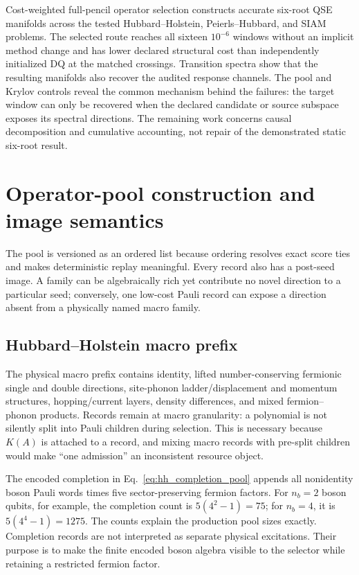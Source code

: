 \documentclass[
  reprint,
  amsmath,
  amssymb,
  aps,
  pra,
  nofootinbib,
  superscriptaddress,
  floatfix
]{revtex4-2}
\begin{document}
Cost-weighted full-pencil operator selection constructs accurate six-root QSE
manifolds across the tested Hubbard--Holstein, Peierls--Hubbard, and SIAM
problems.  The selected route reaches all sixteen $10^{-6}$ windows without an
implicit method change and has lower declared structural cost than
independently initialized DQ at the matched crossings.  Transition spectra
show that the resulting manifolds also recover the audited response channels.
The pool and Krylov controls reveal the common mechanism behind the failures:
the target window can only be recovered when the declared candidate or source
subspace exposes its spectral directions.  The remaining work concerns causal
decomposition and cumulative accounting, not repair of the demonstrated
static six-root result.

\appendix

\section{Operator-pool construction and image semantics}
\label{app:pools}

The pool is versioned as an ordered list because ordering resolves exact score
ties and makes deterministic replay meaningful.  Every record also has a
post-seed image.  A family can be algebraically rich yet contribute no novel
direction to a particular seed; conversely, one low-cost Pauli record can
expose a direction absent from a physically named macro family.

\subsection{Hubbard--Holstein macro prefix}

The physical macro prefix contains identity, lifted number-conserving
fermionic single and double directions, site-phonon ladder/displacement and
momentum structures, hopping/current layers, density differences, and mixed
fermion--phonon products.  Records remain at macro granularity: a polynomial
is not silently split into Pauli children during selection.  This is necessary
because $K(A)$ is attached to a record, and mixing macro records with
pre-split children would make ``one admission'' an inconsistent resource
object.

The encoded completion in Eq.~\eqref{eq:hh_completion_pool} appends all
nonidentity boson Pauli words times five sector-preserving fermion factors.
For $n_b=2$ boson qubits, for example, the completion count is
$5(4^2-1)=75$; for $n_b=4$, it is $5(4^4-1)=1275$.  The counts explain the
production pool sizes exactly.  Completion records are not interpreted as
separate physical excitations.  Their purpose is to make the finite encoded
boson algebra visible to the selector while retaining a restricted fermion
factor.
\end{document}
